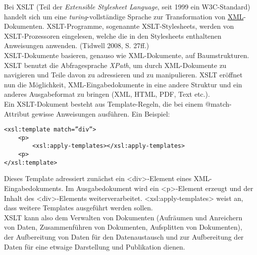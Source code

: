 \documentclass{article}
\begin{document}
    Bei XSLT (Teil der \emph{Extensible Stylesheet Language}, seit
                  1999 ein W3C-Standard) handelt sich um eine \emph{turing}-vollständige Sprache zur Transformation von \href{http://gams.uni-graz.at/o:konde.215}{XML}-Dokumenten. XSLT-Programme, sogenannte
                  XSLT-Stylesheets, werden von XSLT-Prozessoren eingelesen, welche die in den
                  Stylesheets enthaltenen Anweisungen anwenden. (Tidwell 2008, S.
                     27ff.)\\
            
        XSLT-Dokumente basieren, genauso wie XML-Dokumente, auf Baumstrukturen. XSLT
                  benutzt die Abfragesprache \emph{XPath}, um durch XML-Dokumente zu
                  navigieren und Teile davon zu adressieren und zu manipulieren. XSLT eröffnet nun
                  die Möglichkeit, XML-Eingabedokumente in eine andere Struktur und ein anderes
                  Ausgabeformat zu bringen (XML, HTML, PDF, Text etc.).\\
            
        Ein XSLT-Dokument besteht aus Template-Regeln, die bei einem @match-Attribut gewisse Anweisungen ausführen. Ein Beispiel: \\
            
        \begin{verbatim}<xsl:template match=”div”>
    <p>
        <xsl:apply-templates></xsl:apply-templates>
    <p>
</xsl:template>\end{verbatim}Dieses Template adressiert zunächst ein <div>-Element eines
                  XML-Eingabedokuments. Im Ausgabedokument wird ein <p>-Element
                  erzeugt und der Inhalt des <div>-Elements weiterverarbeitet.
                  <xsl:apply-templates> weist an, dass weitere Templates ausgeführt werden
                  sollen.\\
            
        XSLT kann also dem Verwalten von Dokumenten (Aufräumen und Anreichern von Daten,
                  Zusammenführen von Dokumenten, Aufsplitten von Dokumenten), der Aufbereitung von
                  Daten für den Datenaustausch und zur Aufbereitung der Daten für eine etwaige
                  Darstellung und Publikation dienen. \\
            
\end{document}
